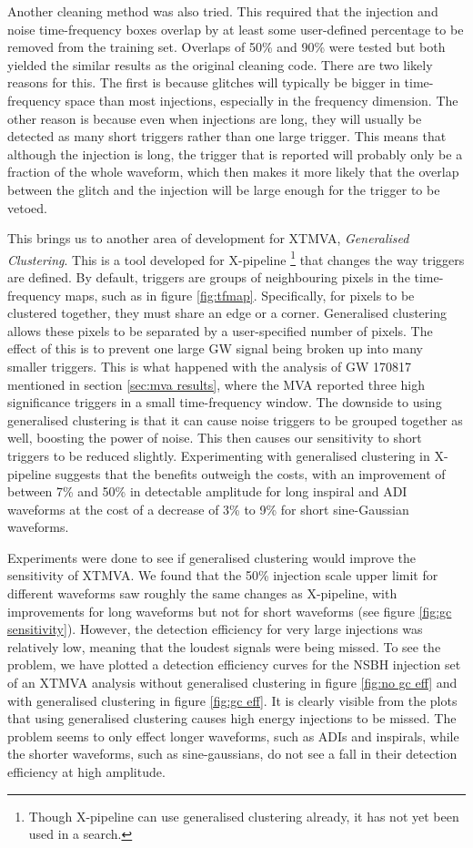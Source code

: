 \documentclass[11pt]{cuthesis}
\newcommand{\xp}{X-pipeline }
\begin{document}
Another cleaning method was also tried. This required that the injection and noise time-frequency boxes overlap by at least some user-defined percentage to be removed from the training set. Overlaps of 50\% and 90\% were tested but both yielded the similar results as the original cleaning code. There are two likely reasons for this. The first is because glitches will typically be bigger in time-frequency space than most injections, especially in the frequency dimension. The other reason is because even when injections are long, they will usually be detected as many short triggers rather than one large trigger. This means that although the injection is long, the trigger that is reported will probably only be a fraction of the whole waveform, which then makes it more likely that the overlap between the glitch and the injection will be large enough for the trigger to be vetoed.

This brings us to another area of development for XTMVA, \textit{Generalised Clustering}. This is a tool developed for \xp\footnote{Though \xp can use generalised clustering already, it has not yet been used in a search.} that changes the way triggers are defined. By default, triggers are groups of neighbouring pixels in the time-frequency maps, such as in figure \ref{fig:tfmap}. Specifically, for pixels to be clustered together, they must share an edge or a corner. Generalised clustering allows these pixels to be separated by a user-specified number of pixels. The effect of this is to prevent one large GW signal being broken up into many smaller triggers. This is what happened with the analysis of GW 170817 mentioned in section \ref{sec:mva results}, where the MVA reported three high significance triggers in a small time-frequency window. The downside to using generalised clustering is that it can cause noise triggers to be grouped together as well, boosting the power of noise. This then causes our sensitivity to short triggers to be reduced slightly. Experimenting with generalised clustering in \xp suggests that the benefits outweigh the costs, with an improvement of between 7\% and 50\% in detectable amplitude for long inspiral and ADI waveforms at the cost of a decrease of 3\% to 9\% for short sine-Gaussian waveforms. 

Experiments were done to see if generalised clustering would improve the sensitivity of XTMVA. We found that the 50\% injection scale upper limit for different waveforms saw roughly the same changes as X-pipeline, with improvements for long waveforms but not for short waveforms (see figure \ref{fig:gc sensitivity}). However, the detection efficiency for very large injections was relatively low, meaning that the loudest signals were being missed. To see the problem, we have plotted a detection efficiency curves for the NSBH injection set of an XTMVA analysis without generalised clustering in figure \ref{fig:no gc eff} and with generalised clustering in figure \ref{fig:gc eff}. It is clearly visible from the plots that using generalised clustering causes high energy injections to be missed. The problem seems to only effect longer waveforms, such as ADIs and inspirals, while the shorter waveforms, such as sine-gaussians, do not see a fall in their detection efficiency at high amplitude.
\end{document}
